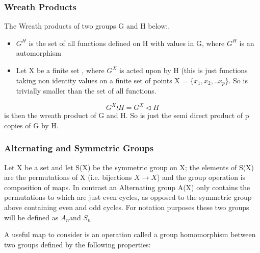 \documentclass{article}
\begin{document}
\subsubsection*{Wreath Products}

The Wreath products of two groups G and H below:.
\begin{itemize}
	\item $G^{H}$ is the set of all functions defined on H with values in G, where $G^{H}$ is an automorphism 
    \item Let X be a finite set , where $G^{X}$ is acted upon by H (this is just functions taking non identity values on a finite set of points X = $\{x_{1},x_{2},.. x_{p}\}$. So is trivially smaller than the set of all functions.
\end{itemize}
\begin{equation}
	G^{X} \wr  H = G^{X} \triangleleft H
\end{equation}
is then the wreath product of G and H. So is just the semi direct product of p copies of G by H.\cite{Wreath}

\paragraph*{}
\newpage
\subsubsection*{Alternating and Symmetric Groups}
Let X be a set and let S(X) be the symmetric group on X; the elements of S(X)
are the permutations of X (i.e. bijections $X\rightarrow X$) and the group operation is
composition of maps.
In contrast an Alternating group A(X) only contains the permutations to which are just even cycles, as opposed to the symmetric group above containing even and odd cycles.  For notation purposes these two groups will be defined as $A_{n} $and $S_{n}$. 



A useful map to consider is an operation called a group homomorphism between two groups defined by the following properties:
\end{document}
